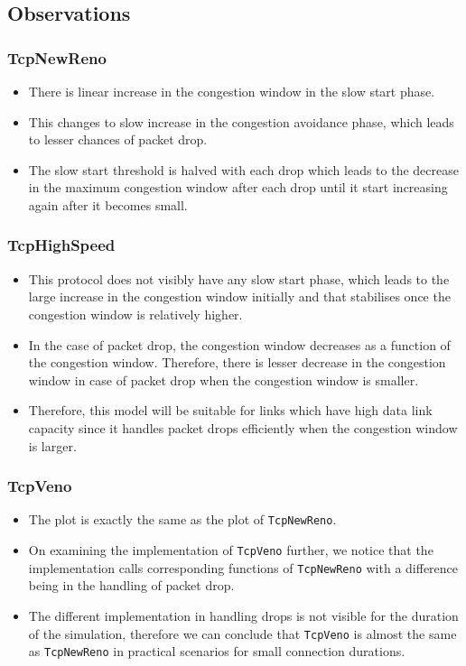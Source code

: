 \documentclass[11pt]{article}
\begin{document}
\subsection{Observations}

\subsubsection{TcpNewReno}
\begin{itemize}
    \item There is linear increase in the congestion window in the slow start phase.
    \item This changes to slow increase in the congestion avoidance phase, which leads to lesser chances of packet drop.
    \item The slow start threshold is halved with each drop which leads to the decrease in the maximum congestion window after each drop until it start increasing again after it becomes small.
\end{itemize}

\subsubsection{TcpHighSpeed}
\begin{itemize}
  \item This protocol does not visibly have any slow start phase, which leads to the large increase in the congestion window initially and that stabilises once the congestion window is relatively higher.
  \item In the case of packet drop, the congestion window decreases as a function of the congestion window. Therefore, there is lesser decrease in the congestion window in case of packet drop when the congestion window is smaller.
  \item Therefore, this model will be suitable for links which have high data link capacity since it handles packet drops efficiently when the congestion window is larger.
\end{itemize}

\subsubsection{TcpVeno}
\begin{itemize}
  \item The plot is exactly the same as the plot of \texttt{TcpNewReno}.
  \item On examining the implementation of \texttt{TcpVeno} further, we notice that the implementation calls corresponding functions of \texttt{TcpNewReno} with a difference being in the handling of packet drop.
  \item The different implementation in handling drops is not visible for the duration of the simulation, therefore we can conclude that \texttt{TcpVeno} is almost the same as \texttt{TcpNewReno} in practical scenarios for small connection durations.
\end{itemize}
\end{document}
